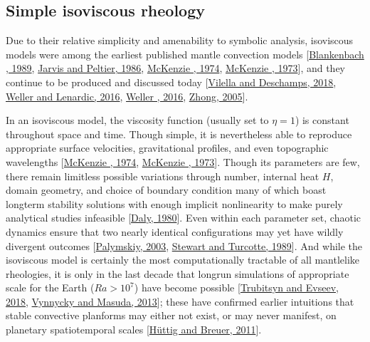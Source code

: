 \documentclass[letterpaper,10pt,english]{jupyterBook}
\begin{document}
\subsection{Simple isoviscous rheology}
\label{\detokenize{content/chapter_04_isoviscous/background/simple:simple-isoviscous-rheology}}\label{\detokenize{content/chapter_04_isoviscous/background/simple::doc}}
\sphinxAtStartPar
Due to their relative simplicity and amenability to symbolic analysis, isoviscous models were among the earliest published mantle convection models {[}\hyperlink{cite.references:id372}{Blankenbach , 1989}, \hyperlink{cite.references:id755}{Jarvis and Peltier, 1986}, \hyperlink{cite.references:id487}{McKenzie , 1974}, \hyperlink{cite.references:id803}{McKenzie , 1973}{]}, and they continue to be produced and discussed today {[}\hyperlink{cite.references:id745}{Vilella and Deschamps, 2018}, \hyperlink{cite.references:id915}{Weller and Lenardic, 2016}, \hyperlink{cite.references:id758}{Weller , 2016}, \hyperlink{cite.references:id811}{Zhong, 2005}{]}.

\sphinxAtStartPar
In an isoviscous model, the viscosity function (usually set to \(\eta=1\)) is constant throughout space and time. Though simple, it is nevertheless able to reproduce appropriate surface velocities, gravitational profiles, and even topographic wavelengths {[}\hyperlink{cite.references:id487}{McKenzie , 1974}, \hyperlink{cite.references:id803}{McKenzie , 1973}{]}. Though its parameters are few, there remain limitless possible variations through  number, internal heat \(H\), domain geometry, and choice of boundary condition \sphinxhyphen{} many of which boast long\sphinxhyphen{}term stability solutions with enough implicit nonlinearity to make purely analytical studies infeasible {[}\hyperlink{cite.references:id774}{Daly, 1980}{]}. Even within each parameter set, chaotic dynamics ensure that two nearly identical configurations may yet have wildly divergent outcomes {[}\hyperlink{cite.references:id911}{Palymskiy, 2003}, \hyperlink{cite.references:id894}{Stewart and Turcotte, 1989}{]}. And while the isoviscous model is certainly the most computationally tractable of all mantle\sphinxhyphen{}like rheologies, it is only in the last decade that long\sphinxhyphen{}run simulations of appropriate scale for the Earth (\(Ra>10^7\)) have become possible {[}\hyperlink{cite.references:id747}{Trubitsyn and Evseev, 2018}, \hyperlink{cite.references:id784}{Vynnycky and Masuda, 2013}{]}; these have confirmed earlier intuitions that stable convective planforms may either not exist, or may never manifest, on planetary spatiotemporal scales {[}\hyperlink{cite.references:id449}{Hüttig and Breuer, 2011}{]}.
\end{document}
